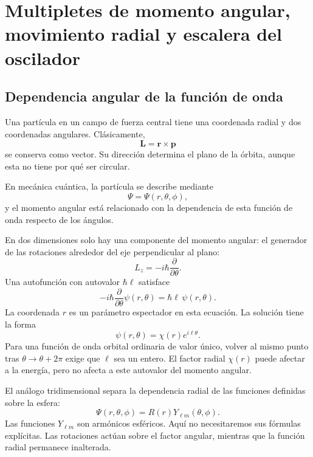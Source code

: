 \chapter{Multipletes de momento angular, movimiento radial y escalera del oscilador}

\section{Dependencia angular de la función de onda}

Una partícula en un campo de fuerza central tiene una coordenada radial y dos coordenadas angulares. Clásicamente,
\begin{equation}
\mathbf L=\mathbf r\times\mathbf p
\end{equation}
se conserva como vector. Su dirección determina el plano de la órbita, aunque esta no tiene por qué ser circular.

En mecánica cuántica, la partícula se describe mediante
\begin{equation}
\Psi=\Psi(r,\theta,\phi),
\end{equation}
y el momento angular está relacionado con la dependencia de esta función de onda respecto de los ángulos.

En dos dimensiones solo hay una componente del momento angular: el generador de las rotaciones alrededor del eje perpendicular al plano:
\begin{equation}
L_z=-i\hbar\frac{\partial}{\partial\theta}.
\end{equation}
Una autofunción con autovalor \(\hbar\ell\) satisface
\begin{equation}
-i\hbar\frac{\partial}{\partial\theta}\psi(r,\theta)
=\hbar\ell\,\psi(r,\theta).
\end{equation}
La coordenada \(r\) es un parámetro espectador en esta ecuación. La solución tiene la forma
\begin{equation}
\psi(r,\theta)=\chi(r)e^{i\ell\theta}.
\end{equation}
Para una función de onda orbital ordinaria de valor único, volver al mismo punto tras \(\theta\to\theta+2\pi\) exige que \(\ell\) sea un entero. El factor radial \(\chi(r)\) puede afectar a la energía, pero no afecta a este autovalor del momento angular.

El análogo tridimensional separa la dependencia radial de las funciones definidas sobre la esfera:
\begin{equation}
\Psi(r,\theta,\phi)=R(r)Y_{\ell m}(\theta,\phi).
\end{equation}
Las funciones \(Y_{\ell m}\) son armónicos esféricos. Aquí no necesitaremos sus fórmulas explícitas. Las rotaciones actúan sobre el factor angular, mientras que la función radial permanece inalterada.


